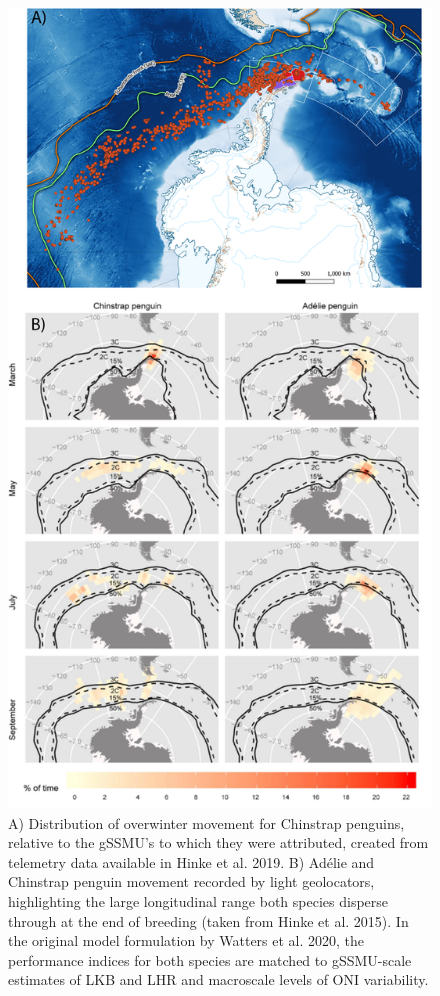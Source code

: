 \documentclass[]{elsarticle} %
\begin{document}
\begin{figure}
\includegraphics[width=0.75\linewidth]{./Watters EMM figures/Overwinter pengo distributions} \caption{A) Distribution of overwinter movement for Chinstrap penguins, relative to the gSSMU's to which they were attributed, created from telemetry data available in Hinke et al. 2019.  B) Adélie and Chinstrap penguin movement recorded by light geolocators, highlighting the large longitudinal range both species disperse through at the end of breeding (taken from Hinke et al. 2015).  In the original model formulation by Watters et al. 2020, the performance indices for both species are matched to gSSMU-scale estimates of LKB and LHR and macroscale levels of ONI variability.}\label{fig:Overwinter penguin  plots}
\end{figure}
\end{document}
